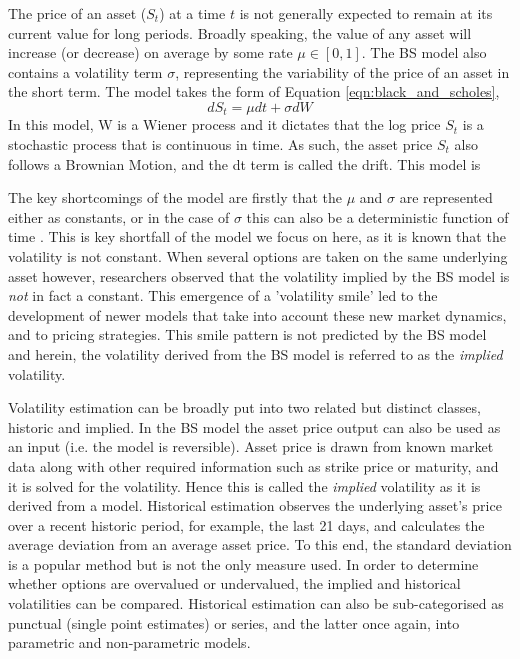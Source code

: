 \documentclass[12pt,oneside]{article}
\begin{document}
The price of an asset ($S_t$) at a time $t$ is not generally expected to remain at its current value for long periods. Broadly speaking, the value of any asset will increase (or decrease) on average by some rate $\mu\in[0,1]$. The BS model also contains a volatility term $\sigma$, representing the variability of the price of an asset in the short term. The model takes the form of Equation \ref{eqn:black_and_scholes},
\begin{equation}
\label{eqn:black_and_scholes} 
dS_t=\mu dt + \sigma dW
\end{equation}
In this model, W is a Wiener process and it dictates that the log price $S_t$ is a stochastic process that is continuous in time. As such, the asset price $S_t$ also follows a Brownian Motion, and the dt term is called the drift. This model is 

The key shortcomings of the model are firstly that the $\mu$ and $\sigma$ are represented either as constants, or in the case of $\sigma$ this can also be a deterministic function of time \cite{BlackScholes1973, gatheral2014volatility}. This is key shortfall of the model we focus on here, as it is known that the volatility is not constant. %
When several options are taken on the same underlying asset however, researchers observed that the volatility implied by the BS model is \emph{not} in fact a constant. This emergence of a 'volatility smile' led to the development of newer models that take into account these new market dynamics, and to pricing strategies. This smile pattern is not predicted by the BS model and herein, the volatility derived from the BS model is referred to as the \emph{implied} volatility. 

Volatility estimation can be broadly put into two related but distinct classes, historic and implied. In the BS model the asset price output can also be used as an input (i.e. the model is reversible). Asset price is drawn from known market data along with other required information such as strike price or maturity, and it is solved for the volatility. Hence this is called the \emph{implied} volatility as it is derived from a model.
Historical estimation observes the underlying asset's price over a recent historic period, for example, the last 21 days, and  calculates the average deviation from an average asset price. To this end, the standard deviation is a popular method but is not the only measure used. In order to determine whether options are overvalued or undervalued, the implied and historical volatilities can be compared. Historical estimation can also be sub-categorised as punctual (single point estimates) or series, and the latter once again, into parametric and non-parametric models. 
\end{document}
